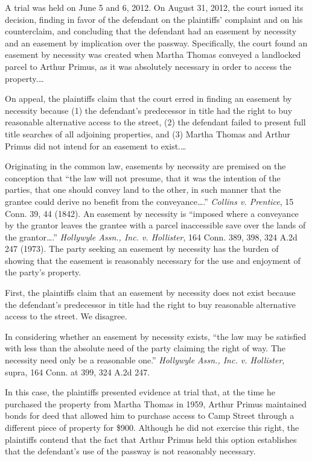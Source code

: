 A trial was held on June 5 and 6, 2012. On August 31, 2012, the court issued its
decision, finding in favor of the defendant on the plaintiffs' complaint and on
his counterclaim, and concluding that the defendant had an easement by necessity
and an easement by implication over the passway. Specifically, the court found
an easement by necessity was created when Martha Thomas conveyed a landlocked
parcel to Arthur Primus, as it was absolutely necessary in order to access the
property.\ldots


On appeal, the plaintiffs claim that the court erred in finding an easement by
necessity because (1) the defendant's predecessor in title had the right to buy
reasonable alternative access to the street, (2) the defendant failed to present
full title searches of all adjoining properties, and (3) Martha Thomas and
Arthur Primus did not intend for an easement to exist.\ldots

Originating in the common law, easements by necessity are premised on the
conception that ``the law will not presume, that it was the intention of the
parties, that one should convey land to the other, in such manner that the
grantee could derive no benefit from the conveyance\ldots.'' \textit{Collins v.
Prentice},  15 Conn. 39, 44 (1842). An easement by necessity is ``imposed where
a conveyance by the grantor leaves the grantee with a parcel inaccessible save
over the lands of the grantor\ldots.'' \textit{Hollywyle Assn., Inc. v.
Hollister},  164 Conn. 389, 398, 324 A.2d 247 (1973). The party seeking an
easement by necessity has the burden of showing that the easement is reasonably
necessary for the use and enjoyment of the party's property.


First, the plaintiffs claim that an easement by necessity does not exist because
the defendant's predecessor in title had the right to buy reasonable alternative
access to the street. We disagree.

In considering whether an easement by necessity exists, ``the law may be
satisfied with less than the absolute need of the party claiming the right of
way. The necessity need only be a reasonable one.'' \textit{Hollywyle Assn.,
Inc. v. Hollister},  supra, 164 Conn. at 399, 324 A.2d 247.

In this case, the plaintiffs presented evidence at trial that, at the time he
purchased the property from Martha Thomas in 1959, Arthur Primus maintained
bonds for deed that allowed him to purchase access to Camp Street through a
different piece of property for \$900. Although he did not exercise this right,
the plaintiffs contend that the fact that Arthur Primus held this option
establishes that the defendant's use of the passway is not reasonably
necessary.

